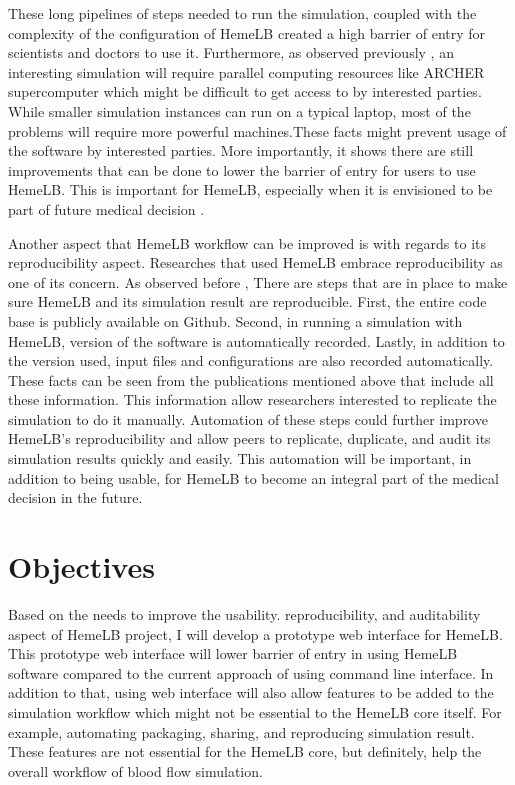 These long pipelines of steps needed to run the simulation, coupled with the complexity of the configuration of HemeLB created a high barrier of entry for scientists and doctors to use it. Furthermore, as observed previously \citep{Steven:2016aa}, an interesting simulation will require parallel computing resources like ARCHER supercomputer which might be difficult to get access to by interested parties. While smaller simulation instances can run on a typical laptop, most of the problems will require more powerful machines.These facts might prevent usage of the software by interested parties. More importantly, it shows there are still improvements that can be done to lower the barrier of entry for users to use HemeLB. This is important for HemeLB, especially when it is envisioned to be part of future medical decision \citep{1_green_2014}.

Another aspect that HemeLB workflow can be improved is with regards to its reproducibility aspect. Researches that used HemeLB embrace reproducibility as one of its concern. As observed before \citep{Steven:2016aa}, There are steps that are in place to make sure HemeLB and its simulation result are reproducible. First, the entire code base is publicly available on Github. Second, in running a simulation with HemeLB, version of the software is automatically recorded. Lastly, in addition to the version used, input files and configurations are also recorded automatically. These facts can be seen from the publications mentioned above \citep{bernabeu2015characterization,itani2015automated,franco2015dynamic,franco2016non} that include all these information. This information allow researchers interested to replicate the simulation to do it manually. Automation of these steps could further improve HemeLB's reproducibility and allow peers to replicate, duplicate, and audit its simulation results quickly and easily. This automation will be important, in addition to being usable, for HemeLB to become an integral part of the medical decision in the future.

\section{Objectives}

Based on the needs to improve the usability. reproducibility, and auditability aspect of HemeLB project, I will develop a prototype web interface for HemeLB. This prototype web interface will lower barrier of entry in using HemeLB software compared to the current approach of using command line interface. In addition to that, using web interface will also allow features to be added to the simulation workflow which might not be essential to the HemeLB core itself. For example, automating packaging, sharing, and reproducing simulation result. These features are not essential for the HemeLB core, but definitely, help the overall workflow of blood flow simulation.

